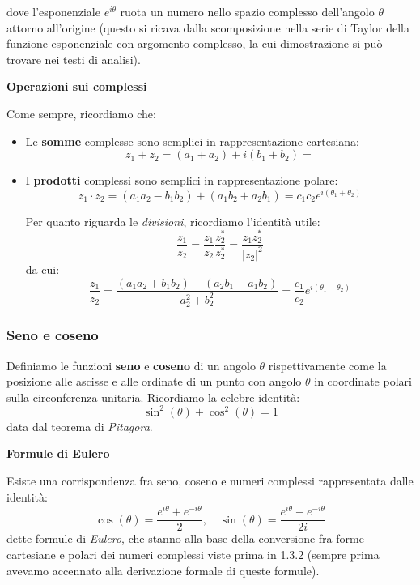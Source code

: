 \documentclass[a4paper,11pt]{article}
\begin{document}
dove l'esponenziale $e^{i \theta}$ ruota un numero nello spazio complesso dell'angolo $\theta$ attorno all'origine (questo si ricava dalla scomposizione nella serie di Taylor della funzione esponenziale con argomento complesso, la cui dimostrazione si può trovare nei testi di analisi).

\par\smallskip

\noindent
\textbf{\textsf{Operazioni sui complessi}}

\noindent
Come sempre, ricordiamo che:
\begin{itemize}
	\item Le \textbf{somme} complesse sono semplici in rappresentazione cartesiana:
		$$
			z_1 + z_2 = (a_1 + a_2) + i(b_1 + b_2) =
		$$
	\item I \textbf{prodotti} complessi sono semplici in rappresentazione polare:
		$$
			z_1 \cdot z_2 = (a_1 a_2 - b_1 b_2) + (a_1 b_2 + a_2 b_1) = c_1 c_2 e^{i(\theta_1 + \theta_2)}
		$$

		Per quanto riguarda le \textit{divisioni}, ricordiamo l'identità utile:
		$$
			\frac{z_1}{z_2} = \frac{z_1}{z_2} \frac{z_2^*}{z_2^*} = \frac{z_1 z_2^*}{|z_2|^2}
		$$
		da cui:
		$$
		\frac{z_1}{z_2} = \frac{(a_1 a_2 + b_1 b_2) + (a_2 b_1 - a_1 b_2)}{a_2^2 + b_2^2} = \frac{c_1}{c_2} e^{i(\theta_1 - \theta_2)}
		$$
\end{itemize}

\subsubsection{Seno e coseno}
Definiamo le funzioni \textbf{seno} e \textbf{coseno} di un angolo $\theta$ rispettivamente come la posizione alle ascisse e alle ordinate di un punto con angolo $\theta$ in coordinate polari sulla circonferenza unitaria.
Ricordiamo la celebre identità:
$$
\sin^2(\theta) + \cos^2(\theta) = 1
$$
data dal teorema di \textit{Pitagora}.


\par\smallskip

\noindent
\textbf{\textsf{Formule di Eulero}}

\noindent
Esiste una corrispondenza fra seno, coseno e numeri complessi rappresentata dalle identità:
$$
\cos(\theta) = \frac{e^{i \theta} + e^{-i \theta}}{2}, \quad \sin(\theta) = \frac{e^{i \theta} - e^{-i \theta}}{2i}
$$
dette formule di \textit{Eulero}, che stanno alla base della conversione fra forme cartesiane e polari dei numeri complessi viste prima in 1.3.2 (sempre prima avevamo accennato alla derivazione formale di queste formule). 
\end{document}
